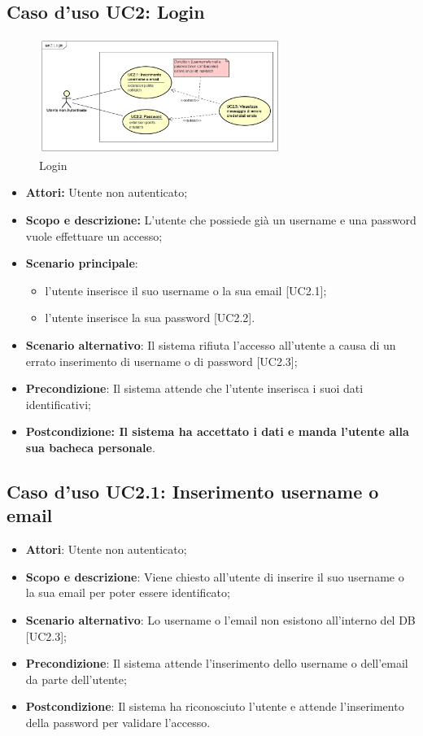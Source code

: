 \documentclass[12pt,a4paper,titlepage]{article}
\begin{document}
	\subsection{Caso d'uso UC2: Login}
	\label{UC2}
	\begin{figure}[H]
		\centering
		\includegraphics[width=0.7\textwidth]{UseCase/Login}
		\caption{Login}
	\end{figure}
	\begin{itemize}
		\item \textbf{Attori:} Utente non autenticato;
		\item \textbf{Scopo e descrizione:} L'utente che possiede già un username e una password vuole effettuare un accesso;
		\item \textbf{Scenario principale}:
		\begin{itemize}
			\item l'utente inserisce il suo username o la sua email [UC2.1];
			\item l'utente inserisce la sua password [UC2.2].
		\end{itemize}
		\item \textbf{Scenario alternativo}: Il sistema rifiuta l'accesso all'utente a causa di un errato inserimento di username o di password [UC2.3];
		\item \textbf{Precondizione}: Il sistema attende che l'utente inserisca i suoi dati identificativi;
		\item \textbf{Postcondizione: Il sistema ha accettato i dati e manda l'utente alla sua bacheca personale}.
	\end{itemize}
	\subsection{Caso d'uso UC2.1: Inserimento username o email}
	\label{UC2.1}
	\begin{itemize}
		\item \textbf{Attori}: Utente non autenticato;
		\item \textbf{Scopo e descrizione}: Viene chiesto all'utente di inserire il suo username o la sua email per poter essere identificato;
		\item \textbf{Scenario alternativo}: Lo username o l'email non esistono all'interno del DB [UC2.3];
		\item \textbf{Precondizione}: Il sistema attende l'inserimento dello username o dell'email da parte dell'utente;
		\item \textbf{Postcondizione}: Il sistema ha riconosciuto l'utente e attende l'inserimento della password per validare l'accesso.
	\end{itemize}
\end{document}
